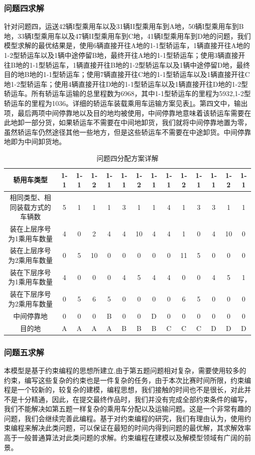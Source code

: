 \documentclass[UTF8]{ctexart}
\begin{document}
\subsubsection{问题四求解}
针对问题四，运送42辆I型乘用车以及31辆II型乘用车到A地，50辆I型乘用车到B地，33辆I型乘用车以及47辆II型乘用车到C地，41辆I型乘用车到D地的问题，我们模型求解的最优结果是，使用6辆直接开往A地的1-1型轿运车，1辆直接开往A地的1-2型轿运车以及1辆中途停留B地，最终开往A地的1-1型轿运车；使用3辆直接开往B地的1-1型轿运车，1辆直接开往B地的1-2型轿运车以及1辆中途停留D地，最终目的地B地的1-1型轿运车；使用7辆直接开往C地的1-1型轿运车以及1辆直接开往C地1-2型轿运车；使用4辆直接开往D地的1-1型轿运车以及1辆直接开往D地的1-2型轿运车。所有轿运车运输的总里程数为6968，其中1-1型轿运车的里程为5932,1-2型轿运车的里程为1036。详细的轿运车装载乘用车运输方案见表\ref{tab:answer4}。第四文中，输出项，最后两项中间停靠地以及目的地均被使用，中间停靠地意味着该轿运车需要在此地卸一部分货，如果轿运车不需要在中间地卸货，我们就将中间停靠地置为零，虽然轿运车仍然途径其他一些地方，但是这些轿运车不需要在中途卸货。中间停靠地即为中间卸货地。
\begin{table}[h!]
\centering
\caption{问题四分配方案详解}\label{tab:answer4}
\begin{tabular}{|c|c|c|c|c|c|c|c|c|c|c|c|c|c|}
\hline
轿用车类型 & 1-1 & 1-1 & 1-2 & 1-1 & 1-1 & 1-2 & 1-1 & 1-1 & 1-2 & 1-1 & 1-1 & 1-2 & 1-1\\ \hline 
相同类型、相同装载方式的车辆数 & 5 & 1 & 1 & 1 & 3 & 1 & 1 & 4 & 1 & 3 & 3 & 1 & 1\\ \hline 
装在上层序号为1乘用车数量 & 4 & 0 & 2 & 4 & 4 & 10 & 4 & 4 & 1 & 0 & 4 & 10 & 0\\ \hline 
装在上层序号为2乘用车数量 & 0 & 5 & 10 & 0 & 0 & 0 & 0 & 0 & 11 & 5 & 0 & 0 & 0\\ \hline 
装在下层序号为1乘用车数量 & 4 & 0 & 0 & 0 & 4 & 5 & 4 & 4 & 0 & 0 & 4 & 5 & 1\\ \hline 
装在下层序号为2乘用车数量 & 0 & 5 & 6 & 5 & 0 & 0 & 0 & 0 & 6 & 5 & 0 & 0 & 0\\ \hline 
中间停靠地 & 0 & 0 & 0 & B & 0 & 0 & D & 0 & 0 & 0 & 0 & 0 & 0\\ \hline 
目的地 & A & A & A & A & B & B & B & C & C & C & D & D & D\\ \hline 
\end{tabular}
\end{table}


\subsubsection{问题五求解}
本模型是基于约束编程的思想所建立,由于第五题问题相对复杂，需要使用较多的约束，编写这些复杂的约束也是一件复杂的任务，由于本次比赛时间所限，约束编程是一个较新的，较复杂的建模，编程思想，我们接触的时间也不是很长，对此并不是十分精通，因此，在提交最终作品时，我们并没有完成全部约束条件的编写，我们不能解决如第五题一样复杂的乘用车分配以及运输问题。这是一个非常有趣的问题，我们会继续完善此编程。基于对约束编程的研究，我们有理由认为，使用约束编程来解决此类问题，可以保证在最短的时间内得到问题的最优解，其求解效率高于一般普通算法对此类问题的求解。约束编程在建模以及解模型领域有广阔的前景。
\end{document}
